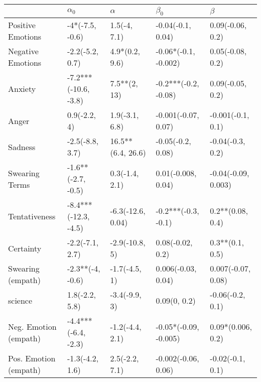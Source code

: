 \begin{tabular}{lllll}
\toprule
{} &            $\alpha_0$ &           $\alpha$ &              $\beta_0$ &              $\beta$ \\
\midrule
Positive Emotions     &       -4*(-7.5, -0.6) &       1.5(-4, 7.1) &      -0.04(-0.1, 0.04) &     0.09(-0.06, 0.2) \\
Negative Emotions     &       -2.2(-5.2, 0.7) &     4.9*(0.2, 9.6) &   -0.06*(-0.1, -0.002) &     0.05(-0.08, 0.2) \\
Anxiety               &  -7.2***(-10.6, -3.8) &       7.5**(2, 13) &   -0.2***(-0.2, -0.08) &     0.09(-0.05, 0.2) \\
Anger                 &          0.9(-2.2, 4) &     1.9(-3.1, 6.8) &    -0.001(-0.07, 0.07) &    -0.001(-0.1, 0.1) \\
Sadness               &       -2.5(-8.8, 3.7) &  16.5**(6.4, 26.6) &      -0.05(-0.2, 0.08) &     -0.04(-0.3, 0.2) \\
Swearing Terms        &    -1.6**(-2.7, -0.5) &     0.3(-1.4, 2.1) &     0.01(-0.008, 0.04) &  -0.04(-0.09, 0.003) \\
Tentativeness         &  -8.4***(-12.3, -4.5) &  -6.3(-12.6, 0.04) &    -0.2***(-0.3, -0.1) &     0.2**(0.08, 0.4) \\
Certainty             &       -2.2(-7.1, 2.7) &     -2.9(-10.8, 5) &       0.08(-0.02, 0.2) &      0.3**(0.1, 0.5) \\
Swearing (empath)     &      -2.3**(-4, -0.6) &      -1.7(-4.5, 1) &     0.006(-0.03, 0.04) &   0.007(-0.07, 0.08) \\
science               &        1.8(-2.2, 5.8) &      -3.4(-9.9, 3) &           0.09(0, 0.2) &     -0.06(-0.2, 0.1) \\
Neg. Emotion (empath) &   -4.4***(-6.4, -2.3) &    -1.2(-4.4, 2.1) &  -0.05*(-0.09, -0.005) &    0.09*(0.006, 0.2) \\
Pos. Emotion (empath) &       -1.3(-4.2, 1.6) &     2.5(-2.2, 7.1) &    -0.002(-0.06, 0.06) &     -0.02(-0.1, 0.1) \\
\bottomrule
\end{tabular}
